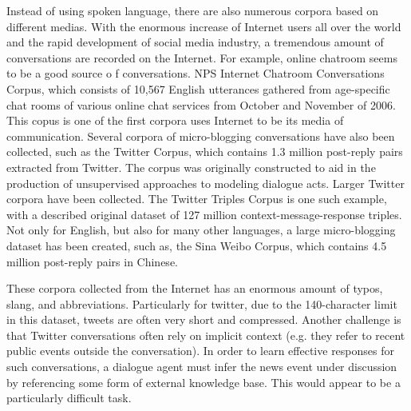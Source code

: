 \documentclass[bsc,frontabs,twoside,singlespacing,parskip,deptreport]{infthesis}     %
\begin{document}
Instead of using spoken language, there are also numerous corpora based on different medias. With the enormous increase of Internet users all over the world and the rapid development of social media industry, a tremendous amount of conversations are recorded on the Internet. For example, online chatroom seems to be a good source o f conversations. NPS Internet Chatroom Conversations Corpus\cite{forsythand2007lexical}, which consists of 10,567 English utterances gathered from age-specific chat rooms of various online chat services from October and November of 2006. This copus is one of the first corpora uses Internet to be its media of communication. Several corpora of micro-blogging conversations have also been collected, such as the Twitter Corpus\cite{ritter2010unsupervised}, which contains 1.3 million post-reply pairs extracted from Twitter. The corpus was originally constructed to aid in the production of unsupervised approaches to modeling dialogue acts. Larger Twitter corpora have been collected. The Twitter Triples Corpus\cite{sordoni2015neural} is one such example, with a described original dataset of 127 million context-message-response triples. Not only for English, but also for many other languages, a large micro-blogging dataset has been created, such as, the Sina Weibo Corpus\cite{shang2015neural}, which contains 4.5 million post-reply pairs in Chinese.

These corpora collected from the Internet has an enormous amount of typos, slang, and abbreviations. Particularly for twitter, due to the 140-character limit in this dataset, tweets are often very short and compressed\cite{serban2018survey}. Another challenge is that Twitter conversations often rely on implicit context (e.g. they refer to recent public events outside the conversation). In order to learn effective responses for such conversations, a dialogue agent must infer the news event under discussion by referencing some form of external knowledge base. This would appear to be a particularly difficult task.
\end{document}
